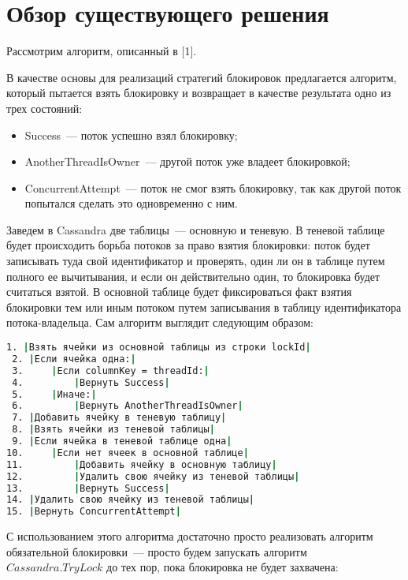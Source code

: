 \section{Обзор существующего решения}

Рассмотрим алгоритм, описанный в [1].

В качестве основы для реализаций стратегий блокировок предлагается алгоритм, который пытается взять блокировку и возвращает в качестве результата одно из трех состояний:

\begin{itemize}
	\item Success~--- поток успешно взял блокировку;
	\item AnotherThreadIsOwner~--- другой поток уже владеет блокировкой;
	\item ConcurrentAttempt~--- поток не смог взять блокировку, так как другой поток попытался сделать это одновременно с ним.
\end{itemize}

Заведем в Cassandra две таблицы~--- основную и теневую. В теневой таблице будет происходить борьба потоков за право взятия блокировки: поток будет записывать туда свой идентификатор и проверять, один ли он в таблице путем полного ее вычитывания, и если он действительно один, то блокировка будет считаться взятой. В основной таблице будет фиксироваться факт взятия блокировки тем или иным потоком путем записывания в таблицу идентификатора потока-владельца.
Сам алгоритм выглядит следующим образом:


\begin{lstlisting}[language=csh,caption={Алгоритм Cassandra.TryLock(lockId, threadId)}]
 1. |Взять ячейки из основной таблицы из строки lockId|
 2. |Если ячейка одна:|
 3. 	|Если columnKey = threadId:|
 4. 		|Вернуть Success|
 5. 	|Иначе:|
 6. 		|Вернуть AnotherThreadIsOwner|
 7. |Добавить ячейку в теневую таблицу|
 8. |Взять ячейки из теневой таблицы|
 9. |Если ячейка в теневой таблице одна|
10. 	|Если нет ячеек в основной таблице|
11. 		|Добавить ячейку в основную таблицу|
12. 		|Удалить свою ячейку из теневой таблицы|
13. 		|Вернуть Success|
14. |Удалить свою ячейку из теневой таблицы|
15. |Вернуть ConcurrentAttempt|
\end{lstlisting}

С использованием этого алгоритма достаточно просто реализовать алгоритм обязательной блокировки~--- просто будем запускать алгоритм\\ $Cassandra.TryLock$ до тех пор, пока блокировка не будет захвачена:

